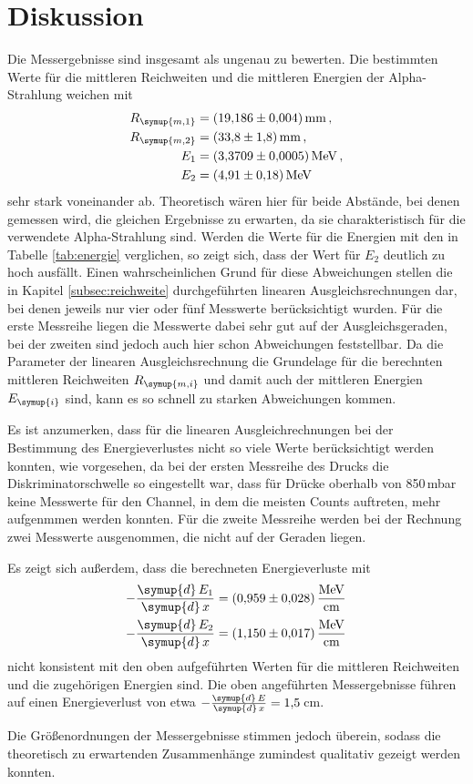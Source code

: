 \section{Diskussion}
\label{sec:Diskussion}

Die Messergebnisse sind insgesamt als ungenau zu bewerten. Die bestimmten Werte
für die mittleren Reichweiten und die mittleren Energien der Alpha-Strahlung
weichen mit
\begin{align*}
  R_{\symup{m,1}}&=\SI{19.186(0004)}{\milli\meter} \,, \\
  R_{\symup{m,2}}&=\SI{33.8(18)}{\milli\meter} \,, \\
  E_1&=\SI{3.3709(00005)}{\MeV} \,,\\
  E_2&=\SI{4.91(018)}{\MeV}
\end{align*}
sehr stark voneinander ab. Theoretisch wären hier für beide Abstände, bei denen gemessen
wird, die gleichen Ergebnisse zu erwarten, da sie charakteristisch für die verwendete
Alpha-Strahlung sind. Werden die Werte für die Energien mit den in Tabelle
\ref{tab:energie} verglichen, so zeigt sich, dass der Wert für $E_2$ deutlich zu
hoch ausfällt. Einen wahrscheinlichen Grund für diese Abweichungen stellen die in
Kapitel \ref{subsec:reichweite} durchgeführten linearen Ausgleichsrechnungen dar,
bei denen jeweils nur vier oder fünf Messwerte berücksichtigt wurden. Für die erste
Messreihe liegen die Messwerte dabei sehr gut auf der Ausgleichsgeraden, bei der
zweiten sind jedoch auch hier schon Abweichungen feststellbar. Da die Parameter
der linearen Ausgleichsrechnung die Grundelage für die berechnten mittleren Reichweiten
$R_{\symup{m,i}}$ und damit auch der mittleren Energien $E_{\symup{i}}$ sind, kann
es so schnell zu starken Abweichungen kommen.

Es ist anzumerken, dass für die linearen Ausgleichrechnungen bei der Bestimmung des
Energieverlustes nicht so viele Werte berücksichtigt werden konnten, wie vorgesehen,
da bei der ersten Messreihe des Drucks die Diskriminatorschwelle so eingestellt war, dass
für Drücke oberhalb von 850\,mbar keine Messwerte für den Channel, in dem die
meisten Counts auftreten, mehr aufgenmmen werden konnten. Für die zweite Messreihe
werden bei der Rechnung zwei Messwerte ausgenommen, die nicht auf der Geraden liegen.

Es zeigt sich außerdem, dass die berechneten Energieverluste mit
\begin{align*}
  -\frac{\symup{d}\,E_1}{\symup{d}\,x}&=\SI{0.959(028)}{\MeV\per\centi\meter} \,\\
  -\frac{\symup{d}\,E_2}{\symup{d}\,x}&=\SI{1.150(017)}{\MeV\per\centi\meter}
\end{align*}
nicht konsistent mit den oben aufgeführten Werten für die mittleren Reichweiten und
die zugehörigen Energien sind. Die oben angeführten Messergebnisse führen auf einen
Energieverlust von etwa $-\frac{\symup{d}\,E}{\symup{d}\,x}=1{,}5\,$cm.

Die Größenordnungen der Messergebnisse stimmen jedoch überein, sodass die theoretisch
zu erwartenden Zusammenhänge zumindest qualitativ gezeigt werden konnten.
